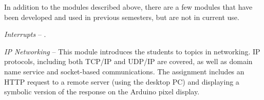 In addition to the modules described above, there are a few modules that
have been developed and used in previous semesters, but are not in current use.

\emph{Interrupts} --
.

\emph{IP Networking} --
This module introduces the students to topics in networking.  IP protocols,
including both TCP/IP and UDP/IP are covered, as well as domain name service
and socket-based communications. The assignment includes an HTTP request
to a remote server (using the desktop PC) and displaying a symbolic version
of the response on the Arduino pixel display.
